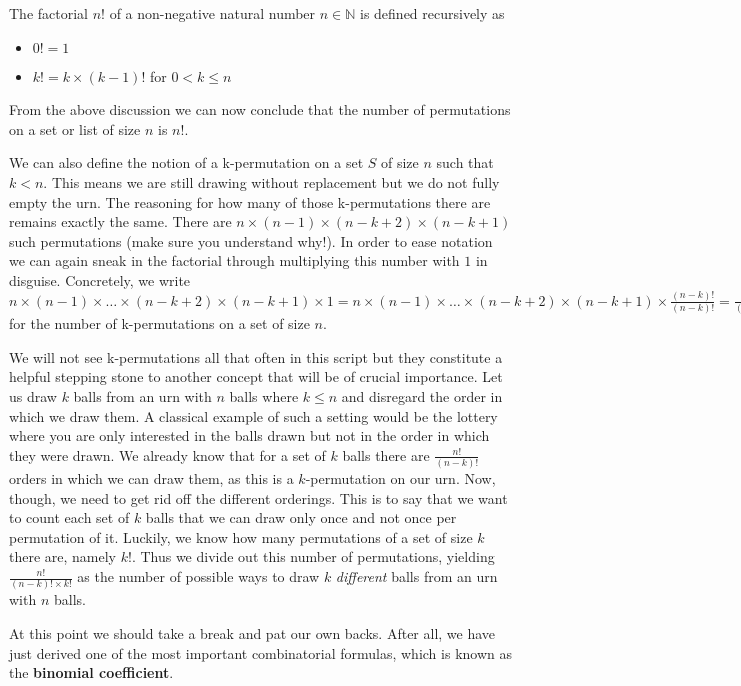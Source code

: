 \documentclass[a4paper,11pt,leqno]{report}
\begin{document}
\begin{Definition} The factorial $ n! $ of a non-negative natural number $ n \in \mathbb{N} $ is defined recursively as 
\begin{itemize}
\item $ 0! = 1 $
\item $ k! = k\times (k-1)! $ for $ 0 < k \leq n $
\end{itemize}
\end{Definition}

From the above discussion we can now conclude that the number of permutations on a set or list of size $ n $
is $ n! $. 

We can also define the notion of a k-permutation on a set $ S $ of size $ n $ such that $ k < n $.
This means we are still drawing without replacement but we do not fully empty the urn. The reasoning for how
many of those k-permutations there are remains exactly the same. There are $ n \times (n-1) \times (n-k+2) 
\times (n-k+1) $ such permutations (make sure you understand why!). In order to ease notation we can again
sneak in the factorial through multiplying this number with $ 1 $ in disguise. Concretely, we write
$ n \times (n-1) \times \ldots \times (n-k+2) \times (n-k+1) \times 1 = n \times (n-1) \times \ldots \times (n-k+2) \times (n-k+1) \times 
\frac{(n-k)!}{(n-k)!}
= \frac{n!}{(n-k)!} $ for the number of k-permutations on a set of size $ n $.

We will not see k-permutations all that often in this script but they constitute a helpful stepping stone to another
concept that will be of crucial importance. Let us draw $ k $ balls from an urn with $ n $ balls where $ k \leq n $ and disregard
the order in which we draw them. A classical example of such a setting would be the lottery where you are only interested in the
balls drawn but not in the order in which they were drawn. We already know that for a set of $ k $ balls there are $ \frac{n!}{(n-k)!} $ 
orders in which we can draw them, as this is a $ k $-permutation on our urn. Now, though, we need to get rid off the different 
orderings. This is to say that we want to count each set of $ k $ balls that we can draw only once and not once per permutation of it.
Luckily, we know how many permutations of a set of size $ k $ there are, namely $ k! $. Thus we divide out this number of permutations,
yielding $ \frac{n!}{(n-k)!\times k!} $ as the number of possible ways to draw $ k $ \textit{different} balls from an urn with $ n $
balls.

At this point we should take a break and pat our own backs. After all, we have just derived one of the most important combinatorial 
formulas, which is known as the \textbf{binomial coefficient}.
\end{document}
